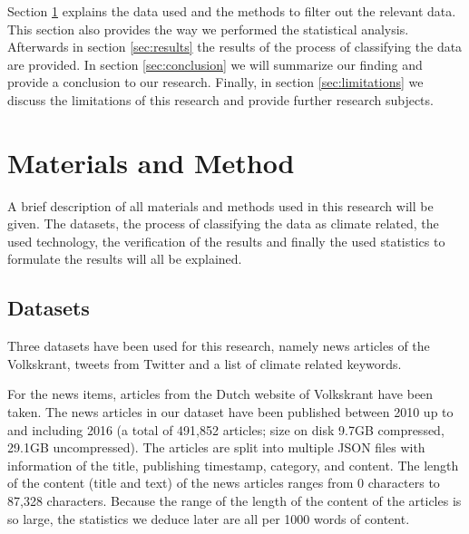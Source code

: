 \documentclass[paper=a4, fontsize=9px]{scrartcl} %
\numberwithin{equation}{section} %
\numberwithin{figure}{section} %
\numberwithin{table}{section} %
\begin{document}
\begin{multicols}{2}
Section \ref{sec:method} explains the data used and the methods to filter out the relevant data. This section also provides the way we performed the statistical analysis.
Afterwards in section \ref{sec:results} the results of the process of classifying the data are provided. In section \ref{sec:conclusion} we will summarize our finding and provide a conclusion to our research. Finally, in section \ref{sec:limitations} we discuss the limitations of this research and provide further research subjects.


\section{Materials and Method}\label{sec:method}

A brief description of all materials and methods used in this research will be given. The datasets, the process of classifying the data as climate related, the used technology, the verification of the results and finally the used statistics to formulate the results will all be explained.


\subsection{Datasets}

Three datasets have been used for this research, namely news articles of the Volkskrant, tweets from Twitter and a list of climate related keywords.

For the news items, articles from the Dutch website of Volkskrant have been taken. The news articles in our dataset have been published between 2010 up to and including 2016 (a total of 491,852 articles; size on disk 9.7GB compressed, 29.1GB uncompressed). The articles are split into multiple JSON files with information of the title, publishing timestamp, category, and content. The length of the content (title and text) of the news articles ranges from 0 characters to 87,328 characters. Because the range of the length of the content of the articles is so large, the statistics we deduce later are all per 1000 words of content. 



\end{multicols}
\end{document}
